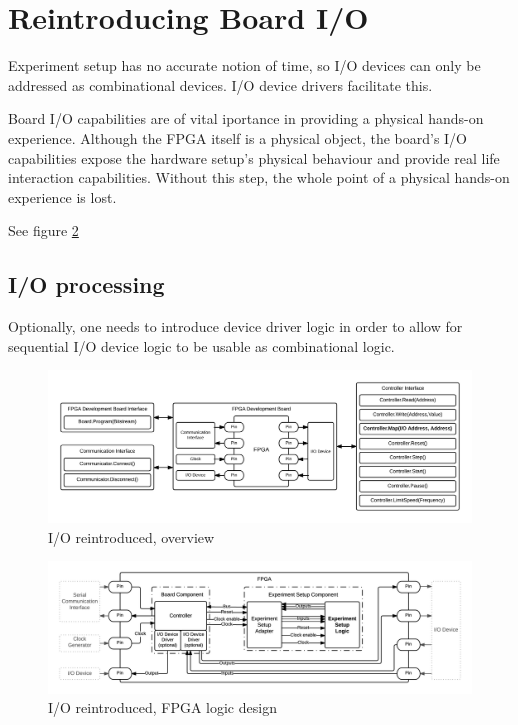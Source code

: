 \documentclass[openright]{template/uva-bachelor-thesis}
\begin{document}
\section{Reintroducing Board I/O}
\label{sectionreintroducingio}

Experiment setup has no accurate notion of time, so I/O devices can only be addressed as combinational devices. I/O device drivers facilitate this.

Board I/O capabilities are of vital iportance in providing a physical hands-on experience. Although the FPGA itself is a physical object, the board's I/O capabilities expose the hardware setup's physical behaviour and provide real life interaction capabilities. Without this step, the whole point of a physical hands-on experience is lost.

See figure \ref{fig:fpga-io}

\subsection{I/O processing}
Optionally, one needs to introduce device driver logic in order to allow for sequential I/O device logic to be usable as combinational logic. 




\begin{figure}[h]
\centering
\includegraphics[width=\textwidth]{img/overview-io}
\caption{I/O reintroduced, overview}
\label{fig:overview-io}
\end{figure}


\begin{figure}[h]
\centering
\includegraphics[width=\textwidth]{img/fpga-io2}
\caption{I/O reintroduced, FPGA logic design}
\label{fig:fpga-io}
\end{figure}
\end{document}
